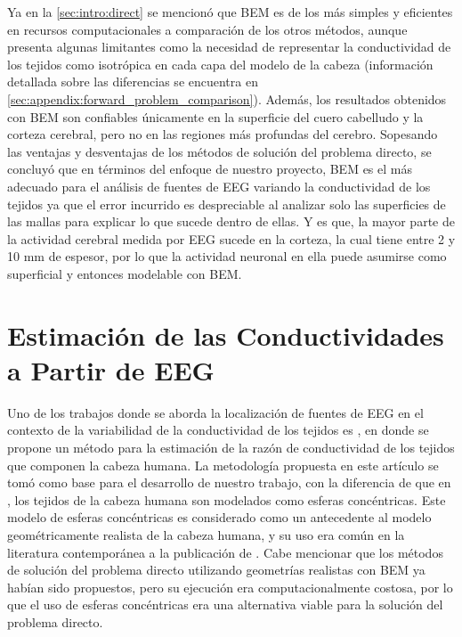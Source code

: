 Ya en la \cref{sec:intro:direct} se mencionó que BEM es de los más simples y eficientes en recursos computacionales a comparación de los otros métodos, aunque presenta algunas limitantes como la necesidad de representar la conductividad de los tejidos como isotrópica en cada capa del modelo de la cabeza (información detallada sobre las diferencias se encuentra en \cref{sec:appendix:forward_problem_comparison}).
Además, los resultados obtenidos con BEM son confiables únicamente en la superficie del cuero cabelludo y la corteza cerebral, pero no en las regiones más profundas del cerebro. 
Sopesando las ventajas y desventajas de los métodos de solución del problema directo, se concluyó que en términos del enfoque de nuestro proyecto, BEM es el más adecuado para el análisis de fuentes de EEG variando la conductividad de los tejidos ya que el error incurrido es despreciable al analizar solo las superficies de las mallas para explicar lo que sucede dentro de ellas. 
Y es que, la mayor parte de la actividad cerebral medida por EEG sucede en la corteza, la cual tiene entre 2 y 10 mm de espesor, por lo que la actividad neuronal en ella puede asumirse como superficial y entonces modelable con BEM.

\section{Estimación de las Conductividades a Partir de EEG}
\label{sec:related:gutierrez}

Uno de los trabajos donde se aborda la localización de fuentes de EEG en el contexto de la variabilidad de la conductividad de los tejidos es \cite{Gutierrez2004}, en donde se propone un método para la estimación de la razón de conductividad de los tejidos que componen la cabeza humana.
La metodología propuesta en este artículo se tomó como base para el desarrollo de nuestro trabajo, con la diferencia de que en \cite{Gutierrez2004}, los tejidos de la cabeza humana son modelados como esferas concéntricas.
Este modelo de esferas concéntricas es considerado como un antecedente al modelo geométricamente realista de la cabeza humana, y su uso era común en la literatura contemporánea a la publicación de \cite{Gutierrez2004}.
Cabe mencionar que los métodos de solución del problema directo utilizando geometrías realistas con BEM ya habían sido propuestos, pero su ejecución era computacionalmente costosa, por lo que el uso de esferas concéntricas era una alternativa viable para la solución del problema directo.

